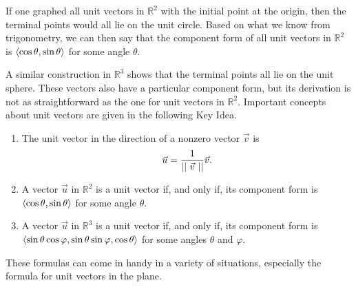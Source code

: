 If one graphed all unit vectors in $\mathbb{R}^2$ with the initial point at the origin, then the terminal points would all lie on the unit circle. Based on what we know from trigonometry, we can then say that the component form of all unit vectors in $\mathbb{R}^2$ is $\left\langle \cos\theta,\sin\theta\right\rangle$ for some angle $\theta$.

A similar construction in $\mathbb{R}^3$ shows that the terminal points all lie on the unit sphere. These vectors also have a particular component form, but its derivation is not as straightforward as the one for unit vectors in $\mathbb{R}^2$. Important concepts about unit vectors are given in the  following Key Idea. 

{\begin{enumerate}
\item		The unit vector in the direction of a nonzero vector $\vec v$ is $$ \vec u = \frac1{||\ \vec v\ ||} \vec v.$$

\item A vector $\vec u$ in $\mathbb{R}^2$ is a unit vector if, and only if, its component form is $\left\langle \cos\theta,\sin\theta\right\rangle$ for some angle $\theta$.
	\item		A vector $\vec u$ in $\mathbb{R}^3$ is a unit vector if, and only if, its component form is $\left\langle \sin\theta\cos\varphi,\sin\theta\sin\varphi,\cos\theta\right\rangle$ for some angles $\theta$ and $\varphi$.
\end{enumerate}
}

These formulas can come in handy in a variety of situations, especially the formula for unit vectors in the plane.\\



